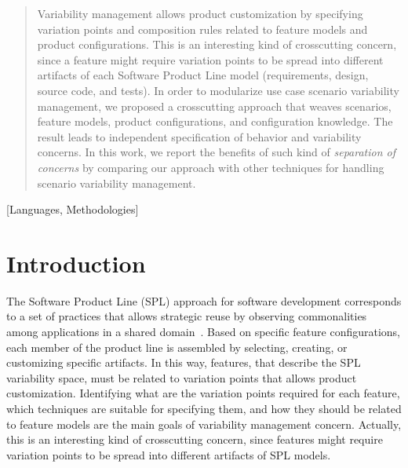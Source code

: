 \documentclass{acm_proc_article-sp}
\begin{document}
\begin{abstract}
Variability management allows product customization by specifying
variation points and composition rules related to feature models and
product configurations. This is an interesting kind of crosscutting
concern, since a feature might require variation points to be spread
into different artifacts of each Software Product Line model
(requirements, design, source code, and tests). In order to modularize
use case
scenario variability management, we proposed a crosscutting approach
that weaves scenarios, feature models, product configurations, and
configuration knowledge. The result leads to independent specification
of behavior and variability concerns. In this work, we report the
benefits of such kind of \emph{separation of concerns} by comparing our
approach with other techniques for handling scenario variability
management. 
\end{abstract}


[Languages,
Methodologies]\



\section{Introduction}
The Software Product Line (SPL) approach for software development corresponds to a set of practices that allows strategic reuse by observing commonalities among applications in a shared domain~\cite{northrop-spl-book,phol-spl-book}. Based on specific feature configurations, each member of the product line is assembled by selecting, creating, or customizing specific artifacts. In this way, features, that describe the SPL variability space, must be related to variation points that allows product customization. 
Identifying what are the variation points required for each feature, which techniques are suitable for specifying them, and how they should be related to feature models are the main goals of variability management concern. Actually, this is an interesting kind of crosscutting concern, since features might require variation points to be spread into different artifacts of SPL models. 
\end{document}
